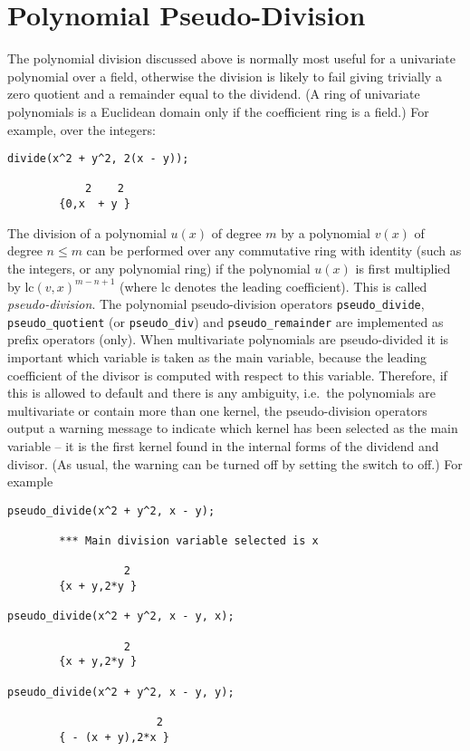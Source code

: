 \section{Polynomial Pseudo-Division}

The polynomial division discussed above is normally most useful for a
univariate polynomial over a field, otherwise the division is likely
to fail giving trivially a zero quotient and a remainder equal to the
dividend.  (A ring of univariate polynomials is a Euclidean domain
only if the coefficient ring is a field.)  For example, over the
integers:
\begin{verbatim}
divide(x^2 + y^2, 2(x - y));

            2    2
        {0,x  + y }
\end{verbatim}

\hypertarget{operator:pseudo_div}{}
\hypertarget{operator:pseudo_divide}{}
\hypertarget{operator:pseudo_quotient}{}
\hypertarget{operator:pseudo_remainder}{}
The division of a polynomial $u(x)$ of degree $m$ by a polynomial
$v(x)$ of degree $n \le m$ can be performed over any commutative ring
with identity (such as the integers, or any polynomial ring) if the
polynomial $u(x)$ is first multiplied by $\mathrm{lc}(v,x)^{m-n+1}$
(where lc denotes the leading coefficient).  This is called
\emph{pseudo-division}.  The 
polynomial pseudo-division operators \texttt{pseudo\_divide},
\texttt{pseudo\_quotient} (or \texttt{pseudo\_div}) and
\texttt{pseudo\_remainder} are implemented as prefix operators (only).  When
multivariate polynomials are pseudo-divided it is important which
variable is taken as the main variable, because the leading
coefficient of the divisor is computed with respect to this variable.
Therefore, if this is allowed to default and there is any ambiguity,
i.e.\ the polynomials are multivariate or contain more than one
kernel, the pseudo-division operators output a warning message to
indicate which kernel has been selected as the main variable -- it is
the first kernel found in the internal forms of the dividend and
divisor.  (As usual, the warning can be turned off by setting the
switch  to off.)  For example
\begin{verbatim}
pseudo_divide(x^2 + y^2, x - y);

        *** Main division variable selected is x 

                  2
        {x + y,2*y }

pseudo_divide(x^2 + y^2, x - y, x);

                  2
        {x + y,2*y }

pseudo_divide(x^2 + y^2, x - y, y);

                       2
        { - (x + y),2*x }
\end{verbatim}

